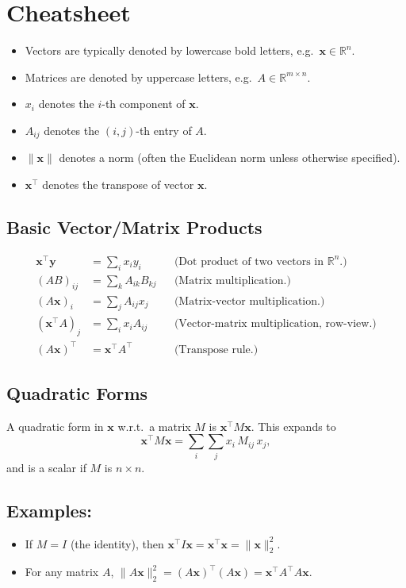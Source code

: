 \section*{Cheatsheet}
\begin{itemize}
  \item Vectors are typically denoted by lowercase bold letters, e.g.\ \(\mathbf{x} \in \mathbb{R}^n\).
  \item Matrices are denoted by uppercase letters, e.g.\ \(A \in \mathbb{R}^{m \times n}\).
  \item \(x_i\) denotes the \(i\)-th component of \(\mathbf{x}\).
  \item \(A_{ij}\) denotes the \((i,j)\)-th entry of \(A\).
  \item \(\|\mathbf{x}\|\) denotes a norm (often the Euclidean norm unless otherwise specified).
  \item \(\mathbf{x}^\top\) denotes the transpose of vector \(\mathbf{x}\).
\end{itemize}

\subsection{Basic Vector/Matrix Products}
\begin{align*}
\mathbf{x}^\top \mathbf{y} 
&= \sum_{i} x_i y_i 
&& \text{(Dot product of two vectors in } \mathbb{R}^n \text{.)}\\[6pt]
(AB)_{ij} 
&= \sum_{k} A_{ik} B_{kj} 
&& \text{(Matrix multiplication.)}\\[6pt]
(A\mathbf{x})_i 
&= \sum_{j} A_{ij} x_j
&& \text{(Matrix-vector multiplication.)}\\[6pt]
(\mathbf{x}^\top A)_j
&= \sum_{i} x_i A_{ij}
&& \text{(Vector-matrix multiplication, row-view.)}\\[6pt]
(A\mathbf{x})^\top 
&= \mathbf{x}^\top A^\top
&& \text{(Transpose rule.)}
\end{align*}

\subsection{Quadratic Forms}
A quadratic form in \(\mathbf{x}\) w.r.t.\ a matrix \(M\) is \(\mathbf{x}^\top M \mathbf{x}\). This expands to
\[
\mathbf{x}^\top M \mathbf{x} 
= \sum_{i} \sum_{j} x_i\, M_{ij}\, x_j,
\]
and is a scalar if \(M\) is \(n \times n\). 

\subsection*{Examples:}
\begin{itemize}
  \item If \(M = I\) (the identity), then \(\mathbf{x}^\top I \mathbf{x} = \mathbf{x}^\top \mathbf{x} = \|\mathbf{x}\|_2^2.\)
  \item For any matrix \(A\), \(\|A\mathbf{x}\|_2^2 = (A\mathbf{x})^\top (A\mathbf{x}) = \mathbf{x}^\top A^\top A \mathbf{x}.\)
\end{itemize}

